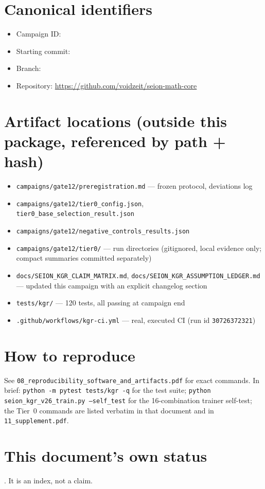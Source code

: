 \documentclass[11pt]{article}
\begin{document}
\section{Canonical identifiers}
\begin{itemize}
  \item Campaign ID: \texttt{\CampaignID}
  \item Starting commit: \texttt{\CanonicalSHA}
  \item Branch: \texttt{\CampaignBranch}
  \item Repository: \url{https://github.com/voidzeit/seion-math-core}
\end{itemize}

\section{Artifact locations (outside this package, referenced by path + hash)}
\begin{itemize}
  \item \texttt{campaigns/gate12/preregistration.md} --- frozen protocol, deviations log
  \item \texttt{campaigns/gate12/tier0\_config.json}, \texttt{tier0\_base\_selection\_result.json}
  \item \texttt{campaigns/gate12/negative\_controls\_results.json}
  \item \texttt{campaigns/gate12/tier0/} --- run directories (gitignored, local evidence only;
        compact summaries committed separately)
  \item \texttt{docs/SEION\_KGR\_CLAIM\_MATRIX.md}, \texttt{docs/SEION\_KGR\_ASSUMPTION\_LEDGER.md}
        --- updated this campaign with an explicit changelog section
  \item \texttt{tests/kgr/} --- 120 tests, all passing at campaign end
  \item \texttt{.github/workflows/kgr-ci.yml} --- real, executed CI (run id \texttt{30726372321})
\end{itemize}

\section{How to reproduce}
See \texttt{08\_reproducibility\_software\_and\_artifacts.pdf} for exact commands. In brief:
\texttt{python -m pytest tests/kgr -q} for the test suite;
\texttt{python seion\_kgr\_v26\_train.py --self\_test} for the 16-combination trainer self-test;
the Tier~0 commands are listed verbatim in that document and in \texttt{11\_supplement.pdf}.

\section{This document's own status}
\DefC. It is an index, not a claim.
\end{document}
